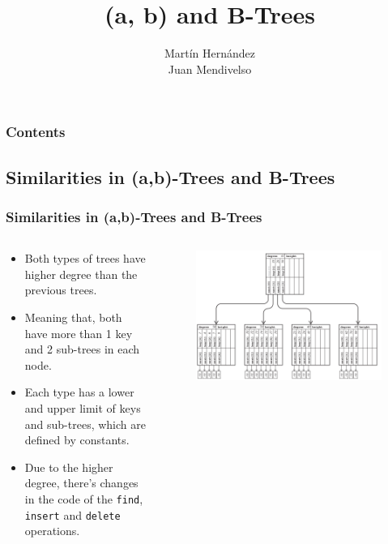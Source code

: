 \documentclass{beamer}
\title{(a, b) and B-Trees}
\author{%
    Martín Hernández\\%
    Juan Mendivelso%
}
\date{} %
\begin{document}


\begin{frame}
    \titlepage
\end{frame}

\begin{frame}
    \frametitle{Contents}
    \tableofcontents
\end{frame}

\begin{frame}
    \section{Similarities in (a,b)-Trees and B-Trees}
    \frametitle{Similarities in (a,b)-Trees and B-Trees}
    \begin{columns}[T]
        \begin{column}{.55\textwidth}
            \begin{block}{}
                \begin{itemize}
                    \item Both types of trees have higher degree than the previous trees.
                    \item Meaning that, both have more than 1 key and 2 sub-trees in each node.
                    \item Each type has a lower and upper limit of keys and sub-trees, 
                        which are defined by constants.
                    \item Due to the higher degree, there's changes in the code of the
                        \lstinline|find|, \lstinline|insert| and \lstinline|delete| operations.
                \end{itemize}
            \end{block}
        \end{column}
        \begin{column}{.6\textwidth}
            \begin{block}{}
                \begin{figure}
                    \centering
                    \includegraphics[width=\textwidth]{resources/book/ab_tree.png}

\end{figure}
\end{block}
\end{column}
\end{columns}
\end{frame}
\end{document}
